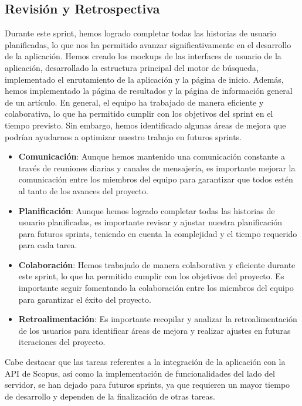 \subsection{Revisión y Retrospectiva}
Durante este sprint, hemos logrado completar todas las historias de usuario planificadas, lo que nos ha permitido avanzar significativamente en el desarrollo de la aplicación.
Hemos creado los mockups de las interfaces de usuario de la aplicación, desarrollado la estructura principal del motor de búsqueda, implementado el enrutamiento de la aplicación y la página de inicio.
Además, hemos implementado la página de resultados y la página de información general de un artículo.
En general, el equipo ha trabajado de manera eficiente y colaborativa, lo que ha permitido cumplir con los objetivos del sprint en el tiempo previsto.
Sin embargo, hemos identificado algunas áreas de mejora que podrían ayudarnos a optimizar nuestro trabajo en futuros sprints.
\begin{itemize}
    \item \textbf{Comunicación}: Aunque hemos mantenido una comunicación constante a través de reuniones diarias y canales de mensajería, es importante mejorar la comunicación entre los miembros del equipo para garantizar que todos estén al tanto de los avances del proyecto.
    \item \textbf{Planificación}: Aunque hemos logrado completar todas las historias de usuario planificadas, es importante revisar y ajustar nuestra planificación para futuros sprints, teniendo en cuenta la complejidad y el tiempo requerido para cada tarea.
    \item \textbf{Colaboración}: Hemos trabajado de manera colaborativa y eficiente durante este sprint, lo que ha permitido cumplir con los objetivos del proyecto. Es importante seguir fomentando la colaboración entre los miembros del equipo para garantizar el éxito del proyecto.
    \item \textbf{Retroalimentación}: Es importante recopilar y analizar la retroalimentación de los usuarios para identificar áreas de mejora y realizar ajustes en futuras iteraciones del proyecto.
\end{itemize}

Cabe destacar que las tareas referentes a la integración de la aplicación con la API de Scopus, así como la implementación de funcionalidades del lado del servidor,
se han dejado para futuros sprints, ya que requieren un mayor tiempo de desarrollo y dependen de la finalización de otras tareas.